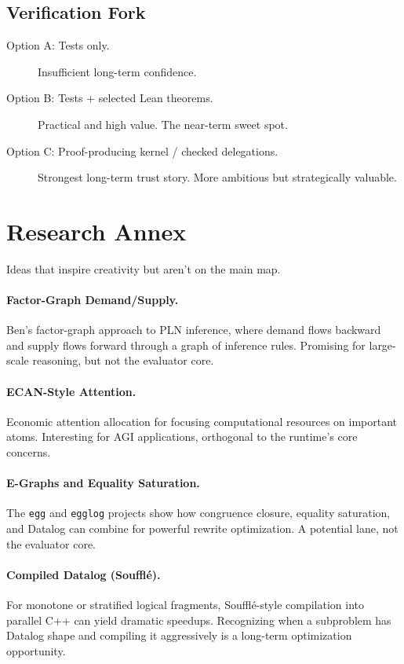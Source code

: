 \documentclass[11pt]{article}
\newcommand{\code}[1]{\texttt{#1}}
\begin{document}
\subsection{Verification Fork}

\begin{description}
\item[Option A: Tests only.]
  Insufficient long-term confidence.
\item[Option B: Tests + selected Lean theorems.]
  Practical and high value.  The near-term sweet spot.
\item[Option C: Proof-producing kernel / checked delegations.]
  Strongest long-term trust story.  More ambitious but strategically valuable.
\end{description}

\appendix
\section{Research Annex}
\label{sec:research}

Ideas that inspire creativity but aren't on the main map.

\paragraph{Factor-Graph Demand/Supply.}
Ben's factor-graph approach to PLN inference, where demand flows backward
and supply flows forward through a graph of inference rules.  Promising
for large-scale reasoning, but not the evaluator core.

\paragraph{ECAN-Style Attention.}
Economic attention allocation for focusing computational resources on
important atoms.  Interesting for AGI applications, orthogonal to the
runtime's core concerns.

\paragraph{E-Graphs and Equality Saturation.}
The \code{egg} and \code{egglog} projects show how congruence closure,
equality saturation, and Datalog can combine for powerful rewrite
optimization.  A potential lane, not the evaluator core.

\paragraph{Compiled Datalog (Soufflé).}
For monotone or stratified logical fragments, Soufflé-style compilation
into parallel C++ can yield dramatic speedups.  Recognizing when a
subproblem has Datalog shape and compiling it aggressively is a
long-term optimization opportunity.
\end{document}
